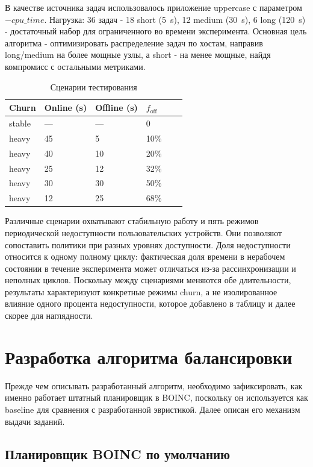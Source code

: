 \documentclass[a4paper,12pt]{extarticle}
\begin{document}
В качестве источника задач использовалось приложение uppercase с параметром $-cpu\_time$. Нагрузка: 36 задач - 18 short (5~s), 12 medium (30~s), 6 long (120~s) - достаточный набор для ограниченного во времени эксперимента. Основная цель алгоритма - оптимизировать распределение задач по хостам, направив long/medium на более мощные узлы, а short - на менее мощные, найдя компромисс с остальными метриками.

\begin{table}[H]
    \centering
    \caption{Сценарии тестирования}
    \footnotesize
    \begin{tabular}{llllll}
        \toprule
        Churn & Online (s) & Offline (s) & $f_{\text{off}}$ \\
        \midrule
        stable & --- & --- & 0 \\
        heavy & 45 & 5 & 10\% \\
        heavy & 40 & 10 & 20\% \\
        heavy & 25 & 12 & 32\% \\
        heavy & 30 & 30 & 50\% \\
        heavy & 12 & 25 & 68\% \\
        \bottomrule
    \end{tabular}
\end{table}

Различные сценарии охватывают стабильную работу и пять режимов периодической недоступности пользовательских устройств. Они позволяют сопоставить политики при разных уровнях доступности. Доля недоступности относится к одному полному циклу: фактическая доля времени в нерабочем состоянии в течение эксперимента может отличаться из-за рассинхронизации и неполных циклов. Поскольку между сценариями меняются обе длительности, результаты характеризуют конкретные режимы churn, а не изолированное влияние одного процента недоступности, которое добавлено в таблицу и далее скорее для наглядности.

\newpage
\section{Разработка алгоритма балансировки}

Прежде чем описывать разработанный алгоритм, необходимо зафиксировать, как именно работает штатный планировщик в BOINC, поскольку он используется как baseline для сравнения с разработанной эвристикой. Далее описан его механизм выдачи заданий.

\subsection{Планировщик BOINC по умолчанию}
\end{document}
